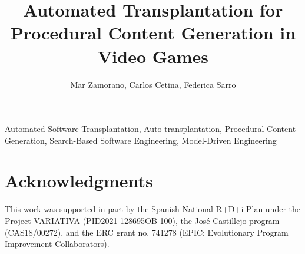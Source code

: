 \documentclass[lettersize,journal]{IEEEtran}
\title{Automated Transplantation for Procedural Content Generation in Video Games}
\author{Mar Zamorano, Carlos Cetina, Federica Sarro}
\begin{document}
\maketitle

\begin{abstract}

\end{abstract}

\begin{IEEEkeywords}
Automated Software Transplantation, Auto-transplantation, Procedural Content Generation, Search-Based Software Engineering, Model-Driven Engineering
\end{IEEEkeywords}











\section*{Acknowledgments}
This work was supported in part by the Spanish National R+D+i Plan under the Project VARIATIVA (PID2021-128695OB-100), the José Castillejo program (CAS18/00272), and the ERC grant no. 741278 (EPIC: Evolutionary Program Improvement Collaborators).




\end{document}
